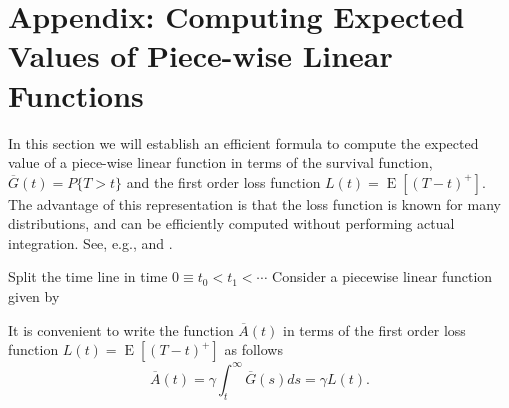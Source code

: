 \documentclass[twoside,USenglish,10pt]{article}
\newcommand{\eg}{e.g.\xspace}
\newcommand{\Ab}{\overline{A}\xspace}
\newcommand{\Gb}{\overline{G}\xspace}
\DeclareMathOperator{\Exp}{E}       %
\newcommand{\E}[1]{\Exp\left[{#1}\right]}       %
\begin{document}
\appendix

\section{Appendix: Computing Expected Values of Piece-wise Linear Functions} \label{app:piecewise}

In this section we will establish an efficient formula to compute the expected value of a piece-wise linear function  in terms  of the survival function, $\Gb(t) = P\{T >t\}$ and the first order loss function $L(t)=\E{(T-t)^+}$.
The advantage of this representation is that the loss function is known for many distributions, and can be efficiently computed without performing actual integration. See, \eg, \cite[Page 14]{burn.ea.10} and \cite[Appendix C]{zipk00}.

Split the time line in time $0\equiv t_0 < t_1 < \cdots$
Consider a piecewise linear function given by



It is convenient to write the function  $\Ab(t)$ in terms of the  first order loss function $L(t)=\E{(T-t)^+}$ as follows
\[ \Ab(t) = \gamma \int_t^\infty \Gb(s)ds = \gamma L(t).\]
\end{document}
